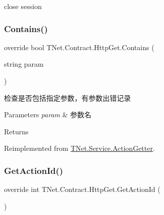 close session 

\mbox{\label{class_t_net_1_1_contract_1_1_http_get_a044f2a121dfb996b4edf9a1e46e3a8a9}} 
\subsubsection{\texorpdfstring{Contains()}{Contains()}}
{\footnotesize\ttfamily override bool T\+Net.\+Contract.\+Http\+Get.\+Contains (\begin{DoxyParamCaption}\item[{string}]{param }\end{DoxyParamCaption})\hspace{0.3cm}{\ttfamily [virtual]}}



检查是否包括指定参数，有参数出错记录 


\begin{DoxyParams}{Parameters}
{\em param} & 参数名\\
\hline
\end{DoxyParams}
\begin{DoxyReturn}{Returns}

\end{DoxyReturn}


Reimplemented from \mbox{\hyperlink{class_t_net_1_1_service_1_1_action_getter_a9a1e277743b2cc5c2a8e9485e16a0060}{T\+Net.\+Service.\+Action\+Getter}}.

\mbox{\label{class_t_net_1_1_contract_1_1_http_get_aa0a8d94ffac5ba1d1ccd91b04727410c}} 
\subsubsection{\texorpdfstring{Get\+Action\+Id()}{GetActionId()}}
{\footnotesize\ttfamily override int T\+Net.\+Contract.\+Http\+Get.\+Get\+Action\+Id (\begin{DoxyParamCaption}{ }\end{DoxyParamCaption})\hspace{0.3cm}{\ttfamily [virtual]}}





